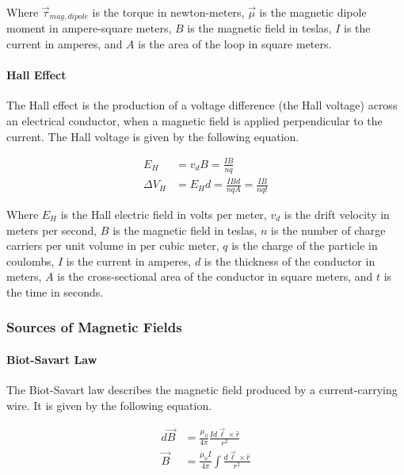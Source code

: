 Where $\vec{\tau}_{mag,dipole}$ is the torque in newton-meters, $\vec{\mu}$ is the magnetic dipole moment in ampere-square meters,
$B$ is the magnetic field in teslas, $I$ is the current in amperes, and $A$ is the area of the loop in square meters.\\


\paragraph*{Hall Effect}
The Hall effect is the production of a voltage difference (the Hall voltage) across an electrical conductor,
when a magnetic field is applied perpendicular to the current. The Hall voltage is given by the following equation.

\begin{align*}
    E_H &= v_dB = \frac{IB}{nq}\\
    \Delta V_H &= E_H d = \frac{IBd}{nqA} = \frac{IB}{nqt}
\end{align*}

Where $E_H$ is the Hall electric field in volts per meter, $v_d$ is the drift velocity in meters per second, $B$ is the magnetic field in teslas,
$n$ is the number of charge carriers per unit volume in per cubic meter, $q$ is the charge of the particle in coulombs, $I$ is the current in amperes,
$d$ is the thickness of the conductor in meters, $A$ is the cross-sectional area of the conductor in square meters, and $t$ is the time in seconds.\\

\pagebreak

\subsubsection*{Sources of Magnetic Fields}
\hrulefill

\paragraph*{Biot-Savart Law}
The Biot-Savart law describes the magnetic field produced by a current-carrying wire. It is given by the following equation.

\begin{align*}
    d\vec{B} &= \frac{\mu_0}{4\pi}\frac{Id\vec{\ell} \times \hat{r}}{r^2}\\
    \vec{B} &= \frac{\mu_0 I}{4\pi}\int \frac{d\vec{\ell} \times \hat{r}}{r^2}\\
\end{align*}

